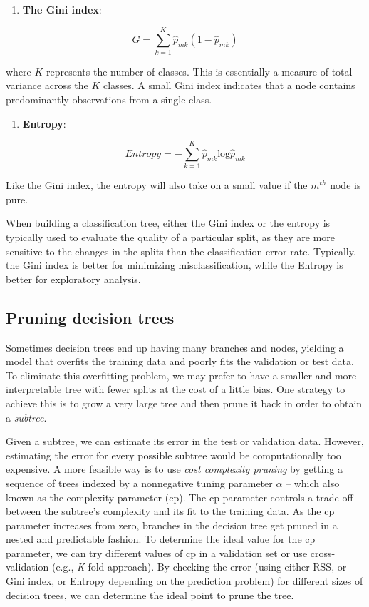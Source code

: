 \documentclass[
]{book}
\providecommand{\tightlist}{%
  \setlength{\itemsep}{0pt}\setlength{\parskip}{0pt}}
\begin{document}
\begin{enumerate}
\def\labelenumi{\arabic{enumi}.}
\tightlist
\item
  \textbf{The Gini index}:
\end{enumerate}

\[
G = \sum_{k=1}^{K}\hat{p}_{mk}(1-\hat{p}_{mk})
\]

where \(K\) represents the number of classes. This is essentially a measure of total variance across the \(K\) classes. A small Gini index indicates that a node contains predominantly observations from a single class.

\begin{enumerate}
\def\labelenumi{\arabic{enumi}.}
\setcounter{enumi}{1}
\tightlist
\item
  \textbf{Entropy}:
\end{enumerate}

\[
Entropy = -\sum_{k=1}^{K}\hat{p}_{mk}\text{log}\hat{p}_{mk}
\]

Like the Gini index, the entropy will also take on a small value if the \(m^{th}\) node is pure.

When building a classification tree, either the Gini index or the entropy is typically used to evaluate the quality of a particular split, as they are more sensitive to the changes in the splits than the classification error rate. Typically, the Gini index is better for minimizing misclassification, while the Entropy is better for exploratory analysis.

\hypertarget{pruning-decision-trees}{%
\subsection{Pruning decision trees}\label{pruning-decision-trees}}

Sometimes decision trees end up having many branches and nodes, yielding a model that overfits the training data and poorly fits the validation or test data. To eliminate this overfitting problem, we may prefer to have a smaller and more interpretable tree with fewer splits at the cost of a little bias. One strategy to achieve this is to grow a very large tree and then prune it back in order to obtain a \emph{subtree}.

Given a subtree, we can estimate its error in the test or validation data. However, estimating the error for every possible subtree would be computationally too expensive. A more feasible way is to use \emph{cost complexity pruning} by getting a sequence of trees indexed by a nonnegative tuning parameter \(\alpha\) -- which also known as the complexity parameter (cp). The cp parameter controls a trade-off between the subtree's complexity and its fit to the training data. As the cp parameter increases from zero, branches in the decision tree get pruned in a nested and predictable fashion. To determine the ideal value for the cp parameter, we can try different values of cp in a validation set or use cross-validation (e.g., \emph{K}-fold approach). By checking the error (using either RSS, or Gini index, or Entropy depending on the prediction problem) for different sizes of decision trees, we can determine the ideal point to prune the tree.
\end{document}
